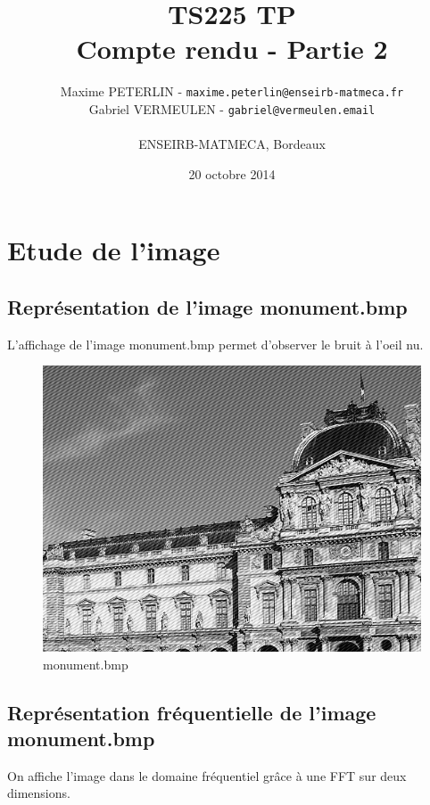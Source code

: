 \documentclass[11pt]{article}
\title{\textbf{TS225 TP}\\Compte rendu - Partie 2}
\author{Maxime PETERLIN - \texttt{maxime.peterlin@enseirb-matmeca.fr}\\
Gabriel VERMEULEN - \texttt{gabriel@vermeulen.email} \\\\{ENSEIRB-MATMECA, Bordeaux}}
\date{20 octobre 2014}
\begin{document}
\maketitle
\tableofcontents

\newpage

\section{Etude de l'image}

	\subsection{Représentation de l'image monument.bmp}

		L'affichage de l'image monument.bmp permet d'observer le bruit à l'oeil nu.

		\begin{figure}[h]
			\centering
			\includegraphics[scale=0.6]{img/monument.png}
			\caption{monument.bmp}
			\label{img1}
		\end{figure}

	\subsection{Représentation fréquentielle de l'image monument.bmp}

		On affiche l'image dans le domaine fréquentiel grâce à une FFT sur deux dimensions.
		
\end{document}
